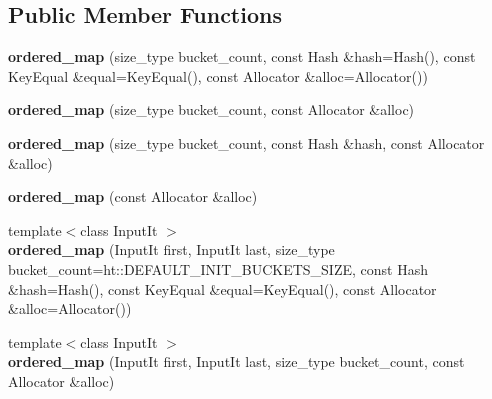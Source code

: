\subsection*{Public Member Functions}
\begin{DoxyCompactItemize}
\item 
\mbox{\label{classtsl_1_1ordered__map_a1b87622b39c868572dfde6fa12f3f348}} 
{\bfseries ordered\+\_\+map} (size\+\_\+type bucket\+\_\+count, const Hash \&hash=Hash(), const Key\+Equal \&equal=Key\+Equal(), const Allocator \&alloc=Allocator())
\item 
\mbox{\label{classtsl_1_1ordered__map_a77eec0507216eef1e262992cb84973a3}} 
{\bfseries ordered\+\_\+map} (size\+\_\+type bucket\+\_\+count, const Allocator \&alloc)
\item 
\mbox{\label{classtsl_1_1ordered__map_a1ec2667585dca1ba0ba4916cc3d1edf0}} 
{\bfseries ordered\+\_\+map} (size\+\_\+type bucket\+\_\+count, const Hash \&hash, const Allocator \&alloc)
\item 
\mbox{\label{classtsl_1_1ordered__map_a470f37c5a73a8114571950a64c1f55d9}} 
{\bfseries ordered\+\_\+map} (const Allocator \&alloc)
\item 
\mbox{\label{classtsl_1_1ordered__map_a66887549acf70ef5c24ddf721fc2b275}} 
{\footnotesize template$<$class Input\+It $>$ }\\{\bfseries ordered\+\_\+map} (Input\+It first, Input\+It last, size\+\_\+type bucket\+\_\+count=ht\+::\+D\+E\+F\+A\+U\+L\+T\+\_\+\+I\+N\+I\+T\+\_\+\+B\+U\+C\+K\+E\+T\+S\+\_\+\+S\+I\+ZE, const Hash \&hash=Hash(), const Key\+Equal \&equal=Key\+Equal(), const Allocator \&alloc=Allocator())
\item 
\mbox{\label{classtsl_1_1ordered__map_aa41bd70f142dec33865bd88419d40b18}} 
{\footnotesize template$<$class Input\+It $>$ }\\{\bfseries ordered\+\_\+map} (Input\+It first, Input\+It last, size\+\_\+type bucket\+\_\+count, const Allocator \&alloc)
\item 
\mbox{\label{classtsl_1_1ordered__map_ab8d0a2cf6f184c786f7693a969607324}} 

\end{DoxyCompactItemize}
